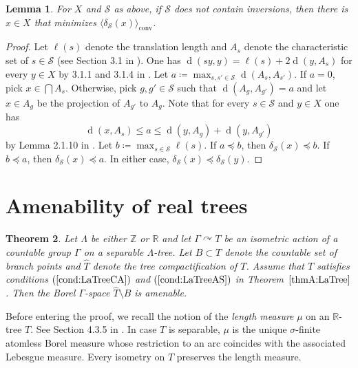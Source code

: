 \documentclass[12pt,nosumlimits,nonamelimits]{amsart}
\newtheorem{thm}{Theorem}
\newtheorem{lem}[thm]{Lemma}
\theoremstyle{remark}
\theoremstyle{definition}
\newcommand{\IR}{\mathbb{R}}
\newcommand{\IZ}{\mathbb{Z}}
\newcommand{\cS}{\mathcal{S}}
\newcommand{\Ga}{\Gamma}
\newcommand{\La}{\Lambda}
\newcommand{\acts}{\curvearrowright}
\DeclareMathOperator{\dist}{d}
\DeclareMathOperator{\conv}{conv}
\newcommand{\ip}[1]{\mathopen{\langle}#1\mathclose{\rangle}}
\begin{document}
\begin{lem}\label{lem:center}
For $X$ and $\cS$ as above, 
if $\cS$ does not contain inversions, 
then there is $x\in X$ that minimizes
$\ip{\delta_{\cS}(x)}_{\conv}$.
\end{lem}
\begin{proof}
Let $\ell(s)$ denote the translation length and 
$A_s$ denote the characteristic set of $s\in\cS$ 
(see Section 3.1 in \cite{chiswell}). 
One has $\dist(sy,y)=\ell(s)+2\dist(y,A_s)$ for every $y\in X$ 
by 3.1.1 and 3.1.4 in \cite{chiswell}. 
Let $a\coloneq \max_{s,s'\in\cS}\dist(A_s,A_{s'})$. 
If $a=0$, pick $x \in \bigcap A_s$. 
Otherwise, 
pick $g,g'\in\cS$ such that $\dist(A_g,A_{g'}) = a$ 
and let $x\in A_g$ be the projection of $A_{g'}$ to $A_g$. 
Note that for every $s\in\cS$ and $y\in X$ one has 
\[ \dist(x,A_s)\le a \le \dist(y,A_g)+\dist(y,A_{g'})
\]
by Lemma 2.1.10 in \cite{chiswell}. 
Let $b \coloneq \max_{s\in\cS} \ell(s)$. 
If $a \preceq b$, 
then $\delta_{\cS}(x) \preceq b$.
If $b \preceq a$, 
then $\delta_{\cS}(x) \preceq a$. 
In either case, $\delta_{\cS}(x) \preceq \delta_{\cS}(y)$.
\end{proof}
%
%
\section{Amenability of real trees}
%
%
\begin{thm}\label{thm:Rtreeequivrel}
Let $\La$ be either $\IZ$ or $\IR$ and 
let $\Ga\acts T$ be an isometric action of 
a countable group $\Ga$ on a separable $\La$-tree.
Let $B\subset T$ denote the countable set of branch points 
and $\hat{T}$ denote the tree compactification of $T$.
Assume that $T$ satisfies conditions 
$(\ref{cond:LaTreeCA})$ and $(\ref{cond:LaTreeAS})$ 
in Theorem~$\ref{thmA:LaTree}$.
Then the Borel $\Ga$-space $\hat{T}\setminus B$ is amenable. 
\end{thm}

Before entering the proof, we recall the notion of 
the \emph{length measure} $\mu$ on an $\IR$-tree $T$. 
See Section 4.3.5 in \cite{evans}. 
In case $T$ is separable, 
$\mu$ is the unique $\sigma$-finite atomless 
Borel measure whose restriction to an arc 
coincides with the associated Lebesgue measure. 
Every isometry on $T$ preserves the length measure.
\end{document}
